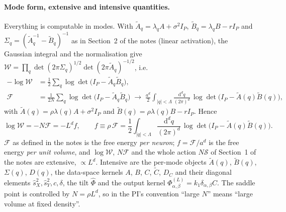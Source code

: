 \documentclass[11pt,a4paper]{article}
\newcommand{\W}{\mathcal W}
\newcommand{\F}{\mathcal F}
\newcommand{\Sact}{\mathcal S}
\newcommand{\dd}{\mathrm d}
\newcommand{\Lam}{\Lambda}
\newcommand{\At}{\tilde A}
\newcommand{\Bt}{\tilde B}
\newcommand{\Ct}{\tilde C}
\newcommand{\sX}{\hat s_X}
\newcommand{\sY}{\hat s_Y}
\newcommand{\ball}[1]{\int_{|q|<\Lam}\frac{\dd^d q}{(2\pi)^d}\,#1}
\begin{document}
\paragraph{Mode form, extensive and intensive quantities.}
Everything is computable in modes. With $\At_q = \lambda_qA + \sigma^2I_P$, $\Bt_q = \lambda_qB - rI_P$ and $\Sigma_q = (\At_q^{-1}-\Bt_q)^{-1}$ as in Section~2 of the notes (linear activation), the Gaussian integral and the normalisation give $\W = \prod_q\det(2\pi\Sigma_q)^{1/2}\det(2\pi\At_q)^{-1/2}$, i.e.
\begin{equation}
\begin{aligned}
  -\log\W &= \frac12\sum_q\log\det\big(I_P - \At_q\Bt_q\big),\\
  \F &= \frac{1}{2N}\sum_q\log\det\big(I_P - \At_q\Bt_q\big)
  \;\to\;
  \frac{a^d}{2}\ball{\log\det\big(I_P - \At(q)\Bt(q)\big)},
\end{aligned}
  \label{eq:F-cont}
\end{equation}
with $\At(q) = \rho\lambda(q)A + \sigma^2I_P$ and $\Bt(q) = \rho\lambda(q)B - rI_P$. Hence
\begin{equation}
  \log\W = -N\F = -L^d f,
  \qquad
  f \equiv \rho\,\F = \frac12\ball{\log\det\Big(I_P-\At(q)\Bt(q)\Big)} .
  \label{eq:f-per-volume}
\end{equation}
$\F$ as defined in the notes is the free energy \emph{per neuron}; $f = \F/a^d$ is the free energy \emph{per unit volume}, and $\log\W$, $N\F$ and the whole action $N\Sact$ of Section~1 of the notes are extensive, $\propto L^d$. Intensive are the per-mode objects $\At(q)$, $\Bt(q)$, $\Sigma(q)$, $D(q)$, the data-space kernels $A$, $B$, $C$, $\Ct$, $D_C$ and their diagonal elements $\sX^2,\sY^2,c,\delta$, the tilt $\hat\Phi$ and the output kernel $\Phi^{(L)}_{\alpha,\beta} = k_1\delta_{\alpha,\beta}C$. The saddle point is controlled by $N = \rho L^d$, so in the PI's convention ``large $N$'' means ``large volume at fixed density''.
\end{document}
